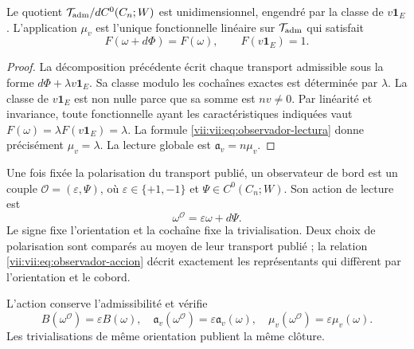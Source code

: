 \begin{theorem}
\label{vii:vii:thm:observador-unicidad}
Le quotient
\(\mathcal T_{\rm adm}/dC^0(C_n;W)\) est unidimensionnel, engendré
par la classe de \(v\mathbf1_E\). L'application \(\mu_v\) est l'unique
fonctionnelle linéaire sur \(\mathcal T_{\rm adm}\) qui satisfait
\[
 F(\omega+d\Phi)=F(\omega),\qquad F(v\mathbf1_E)=1.
\]
\end{theorem}

\begin{proof}
La décomposition précédente écrit chaque transport admissible sous la forme
\(d\Phi+\lambda v\mathbf1_E\). Sa classe modulo les cochaînes exactes
est déterminée par \(\lambda\). La classe de \(v\mathbf1_E\)
est non nulle parce que sa somme est \(nv\neq0\). Par linéarité et
invariance, toute fonctionnelle ayant les caractéristiques indiquées vaut
\(F(\omega)=\lambda F(v\mathbf1_E)=\lambda\). La formule
\eqref{vii:vii:eq:observador-lectura} donne précisément \(\mu_v=\lambda\).
La lecture globale est \(\mathfrak a_v=n\mu_v\).
\end{proof}

\begin{definition}
\label{vii:vii:def:observador-borde}
Une fois fixée la polarisation du transport publié, un observateur de bord
est un couple \(\mathcal O=(\varepsilon,\Psi)\), où
\(\varepsilon\in\{+1,-1\}\) et \(\Psi\in C^0(C_n;W)\).
Son action de lecture est
\begin{equation}
 \omega^{\mathcal O}=\varepsilon\omega+d\Psi.
 \label{vii:vii:eq:observador-accion}
\end{equation}
Le signe fixe l'orientation et la cochaîne fixe la trivialisation. Deux choix de polarisation sont comparés au moyen de leur transport publié ; la relation \eqref{vii:vii:eq:observador-accion} décrit exactement les représentants qui diffèrent par l'orientation et le cobord.
\end{definition}

\begin{proposition}
\label{vii:vii:prop:observador-covarianza}
L'action conserve l'admissibilité et vérifie
\[
 B(\omega^{\mathcal O})=\varepsilon B(\omega),\quad
 \mathfrak a_v(\omega^{\mathcal O})=\varepsilon\mathfrak a_v(\omega),
 \quad \mu_v(\omega^{\mathcal O})=\varepsilon\mu_v(\omega).
\]
Les trivialisations de même orientation publient la même clôture.
\end{proposition}

